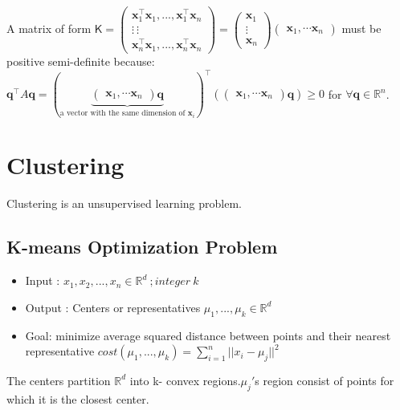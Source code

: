 \documentclass[12pt]{article}
\begin{document}
 
 
 
 
 
 A matrix of form $\mathsf{K}=\begin{pmatrix} \mathbf{x}_1^\top \mathbf{x}_1, ..., \mathbf{x}_1^\top \mathbf{x}_n \\ \vdots ~ \vdots \\ \mathbf{x}_n^\top \mathbf{x}_1, ..., \mathbf{x}_n^\top \mathbf{x}_n \end{pmatrix}=\begin{pmatrix} \mathbf{x}_1\\ \vdots \\ \mathbf{x}_n \end{pmatrix} \begin{pmatrix} \mathbf{x}_1, \cdots \mathbf{x}_n \end{pmatrix}$  must be positive semi-definite because:
 $\mathbf{q}^\top A\mathbf{q}=(\underbrace{\begin{pmatrix} \mathbf{x}_1, \cdots \mathbf{x}_n \end{pmatrix}\mathbf{q}}_{\text{a vector with the same dimension of } \mathbf{x}_i})^\top (\begin{pmatrix} \mathbf{x}_1, \cdots \mathbf{x}_n \end{pmatrix}\mathbf{q})\geq 0$ for $\forall \mathbf{q}\in\mathbb{R}^n$. 
 
 
 
 
 
 
 
 
 
 
 
 
 
 
 
 

 \section{Clustering}
 Clustering is an unsupervised learning problem.
 
 
 \subsection{K-means Optimization Problem}
 
 \begin{itemize}
 	\item Input : $x_{1}, x_{2}, ... , x_{n} \in \mathbb{R}^{d} \ ; integer \ k$
 	\item Output : Centers or representatives $\mu_{1},...,\mu_{k} \in \mathbb{R} ^{d}$
 	\item Goal: minimize average squared distance between points and their nearest representative  $ cost(\mu_{1},...,\mu_{k}) = \sum_{i=1}^{n} \vert \vert x_{i} - \mu_{j} \vert \vert ^{2} $
 \end{itemize}
The centers partition $\mathbb{R}^{d}$ into k- convex regions.$\mu_{j}'$s region consist of points for which it is the closest center.
\end{document}
